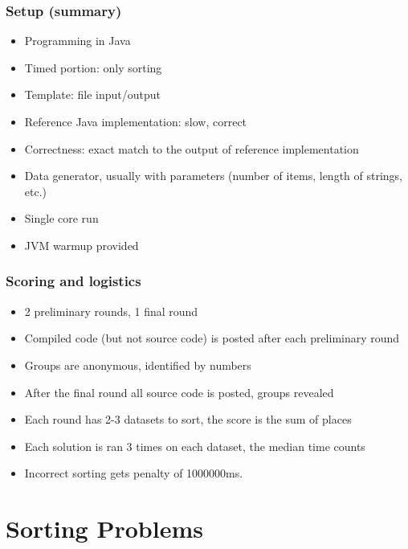 \documentclass{beamer}
\begin{document}
\begin{frame}
\frametitle{Setup (summary)}
\begin{itemize}
\item Programming in Java
\item Timed portion: only sorting
\item Template: file input/output
\item Reference Java implementation: slow, correct
\item Correctness: exact match to the output of reference implementation
\item Data generator, usually with parameters (number of items, length of strings, etc.)
\item Single core run
\item JVM warmup provided
\end{itemize}
\end{frame}

\begin{frame}
\frametitle{Scoring and logistics}
\begin{itemize}
\item 2 preliminary rounds, 1 final round
\item Compiled code (but not source code) is posted after each preliminary round
\item Groups are anonymous, identified by numbers
\item After the final round all source code is posted, groups revealed
\item Each round has 2-3 datasets to sort, the score is the sum of places
\item Each solution is ran 3 times on each dataset, the median time counts
\item Incorrect sorting gets penalty of 1000000ms. 
\end{itemize}
\end{frame}

\section{Sorting Problems}
\end{document}
